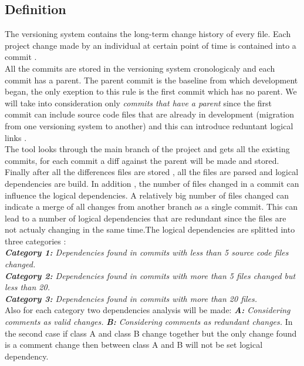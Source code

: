 \subsection{Definition}
The versioning system contains the long-term change history of every file. Each project change made by an individual at certain point of time is contained into a commit \cite{ct7}.\\ All the commits are stored in the versioning system cronologicaly and each commit has a parent. The parent commit is the baseline from which development began, the only exeption to this rule is the first commit which has no parent. We will take into consideration only \textit{commits that have a parent} since the first commit can include source code files that are already in development (migration from one versioning system to another) and this can introduce reduntant logical links \cite{ct8} .\\ The tool looks through the main branch of the project and gets all the existing commits, for each commit a diff against the parent will be made and stored.\\ Finally after all the differences files are stored , all the files are parsed and logical dependencies are build. In addition , the number of files changed in a commit can influence the logical dependencies. A relatively big number of files changed can indicate a merge of all changes from another branch as a single commit. This can lead to a number of logical dependencies that are redundant since the files are not actualy changing in the same time.The logical dependencies are splitted into three categories :\\
\textit{\textbf{Category 1:} Dependencies found in commits with less than 5 source code files changed.}\\
\textit{\textbf{Category 2:} Dependencies found in commits with more than 5 files changed but less than 20. }\\
\textit{\textbf{Category 3:} Dependencies found in commits with more than 20 files.}\\

Also for each category two dependencies analysis will be made:
\textit{\textbf{A:} Considering comments  as valid changes.}
\textit{\textbf{B:} Considering comments  as redundant changes. }
In the second case if class A and class B change together but the only change found is a comment change then between class A and B will not be set logical dependency.
